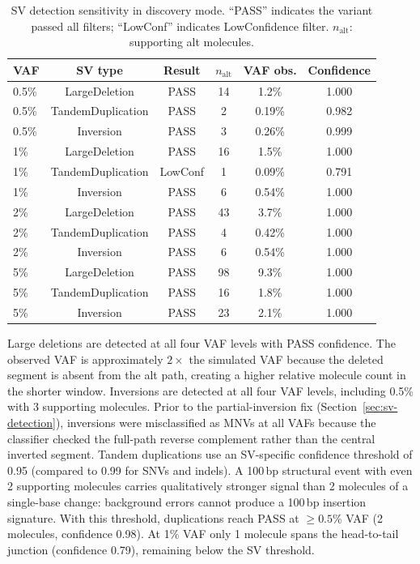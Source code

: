\begin{table}[h]
  \centering
  \caption{SV detection sensitivity in discovery mode. ``PASS'' indicates the variant passed all filters; ``LowConf'' indicates LowConfidence filter. $n_\text{alt}$: supporting alt molecules.}
  \label{tab:sv-results}
  \small
  \begin{tabular}{lccccc}
    \toprule
    VAF & SV type & Result & $n_\text{alt}$ & VAF obs. & Confidence \\
    \midrule
    0.5\% & LargeDeletion    & PASS    & 14 & 1.2\% & 1.000 \\
    0.5\% & TandemDuplication & PASS    & 2  & 0.19\% & 0.982 \\
    0.5\% & Inversion        & PASS    & 3  & 0.26\% & 0.999 \\
    1\%   & LargeDeletion    & PASS    & 16 & 1.5\% & 1.000 \\
    1\%   & TandemDuplication & LowConf & 1  & 0.09\% & 0.791 \\
    1\%   & Inversion        & PASS    & 6  & 0.54\% & 1.000 \\
    2\%   & LargeDeletion    & PASS    & 43 & 3.7\% & 1.000 \\
    2\%   & TandemDuplication & PASS   & 4  & 0.42\% & 1.000 \\
    2\%   & Inversion        & PASS    & 6  & 0.54\% & 1.000 \\
    5\%   & LargeDeletion    & PASS    & 98 & 9.3\% & 1.000 \\
    5\%   & TandemDuplication & PASS   & 16 & 1.8\% & 1.000 \\
    5\%   & Inversion        & PASS    & 23 & 2.1\% & 1.000 \\
    \bottomrule
  \end{tabular}
\end{table}

Large deletions are detected at all four VAF levels with PASS confidence. The observed VAF is approximately $2\times$ the simulated VAF because the deleted segment is absent from the alt path, creating a higher relative molecule count in the shorter window. Inversions are detected at all four VAF levels, including 0.5\% with 3 supporting molecules. Prior to the partial-inversion fix (Section~\ref{sec:sv-detection}), inversions were misclassified as MNVs at all VAFs because the classifier checked the full-path reverse complement rather than the central inverted segment. Tandem duplications use an SV-specific confidence threshold of 0.95 (compared to 0.99 for SNVs and indels). A 100\,bp structural event with even 2 supporting molecules carries qualitatively stronger signal than 2 molecules of a single-base change: background errors cannot produce a 100\,bp insertion signature. With this threshold, duplications reach PASS at $\ge 0.5\%$ VAF (2 molecules, confidence 0.98). At 1\% VAF only 1 molecule spans the head-to-tail junction (confidence 0.79), remaining below the SV threshold.

